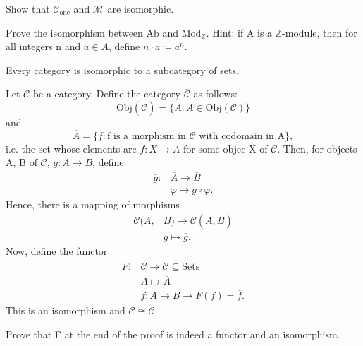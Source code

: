 \documentclass[../category_theory.tex]{subfiles}
\begin{document}
\begin{exr}
	Show that \(\mathcal{C}_{\text{one}}\) and \(\mathcal{M}\) are isomorphic.
\end{exr}
\begin{exr}
	Prove the isomorphism between \(\mathrm{Ab}\) and \(\mathrm{Mod}_{\mathbb{Z}}\). Hint: if A is a \(\mathbb{Z}\)-module, then for all integers n and \(a\in A\), define \(n \cdot a\coloneqq a^{n}\).
\end{exr}
\begin{theorem*}
	Every category is isomorphic to a subcategory of sets.
\end{theorem*}
\begin{proof*}[Sketch]
	Let \(\mathcal{C}\) be a category. Define the category \(\overline{\mathcal{C}}\) as follows:
	\[
		\mathrm{Obj}(\overline{\mathcal{C}})=\{\overline{A}: A\in \mathrm{Obj}(\mathcal{C})\}
	\]
	and
	\[
		\overline{A}=\{f: \text{f is a morphism in } \mathcal{C} \text{ with codomain in A}\},
	\]
	i.e. the set whose elements are \(f:X\rightarrow A\) for some objec X of \(\mathcal{C}.\) Then, for objects A, B of \(\mathcal{C}\), \(g:A\rightarrow B\), define
	\begin{align*}
		\overline{g}: & \overline{A}\rightarrow \overline{B} \\
		              & \varphi \mapsto g\circ \varphi .
	\end{align*}
	Hence, there is a mapping of morphisms
	\begin{align*}
		\mathcal{C}(A, & B)\rightarrow \overline{\mathcal{C}}(\overline{A}, \overline{B}) \\
		               & g\mapsto \overline{g}.
	\end{align*}
	Now, define the functor
	\begin{align*}
		F: & \mathcal{C}\rightarrow \overline{\mathcal{C}}\subseteq \mathrm{Sets} \\
		   & A\mapsto \overline{A}                                                \\
		   & f:A\rightarrow B \longrightarrow F(f)=\overline{f}.
	\end{align*}
	This is an isomorphism and \(\mathcal{C}\cong \overline{\mathcal{C}}.\) \qedsymbol
\end{proof*}

\begin{exr}
	Prove that F at the end of the proof is indeed a functor and an isomorphism.
\end{exr}
\end{document}
